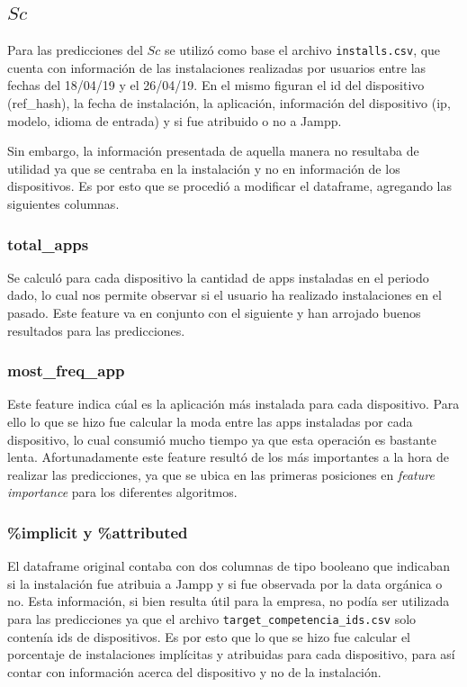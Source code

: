 \documentclass[a4paper, 12pt]{article}
\begin{document}
\subsection{$Sc$}
Para las predicciones del $Sc$ se utilizó como base el archivo \texttt{installs.csv}, que cuenta con información de las instalaciones realizadas por usuarios entre las fechas del 18/04/19 y el 26/04/19. En el mismo figuran el id del dispositivo (ref\_hash), la fecha de instalación, la aplicación, información del dispositivo (ip, modelo, idioma de entrada) y si fue atribuido o no a Jampp. 

Sin embargo, la información presentada de aquella manera no resultaba de utilidad ya que se centraba en la instalación y no en información de los dispositivos. Es por esto que se procedió a modificar el dataframe, agregando las siguientes columnas.

\subsubsection*{total\_apps}
Se calculó para cada dispositivo la cantidad de apps instaladas en el periodo dado, lo cual nos permite observar si el usuario ha realizado instalaciones en el pasado. Este feature va en conjunto con el siguiente y han arrojado buenos resultados para las predicciones.

\subsubsection*{most\_freq\_app}
Este feature indica cúal es la aplicación más instalada para cada dispositivo. Para ello lo que se hizo fue calcular la moda entre las apps instaladas por cada dispositivo, lo cual consumió mucho tiempo ya que esta operación es bastante lenta. 
Afortunadamente este feature resultó de los más importantes a la hora de realizar las predicciones, ya que se ubica en las primeras posiciones en \textit{feature importance} para los diferentes algoritmos.

\subsubsection*{\%implicit y \%attributed}
El dataframe original contaba con dos columnas de tipo booleano que indicaban si la instalación fue atribuia a Jampp y si fue observada por la data orgánica o no. Esta información, si bien resulta útil para la empresa, no podía ser utilizada para las predicciones ya que el archivo \texttt{target\_}\texttt{competencia\_}\texttt{ids.csv} solo contenía ids de dispositivos. Es por esto que lo que se hizo fue calcular el porcentaje de instalaciones implícitas y atribuidas para cada dispositivo, para así contar con información acerca del dispositivo y no de la instalación.
\end{document}
